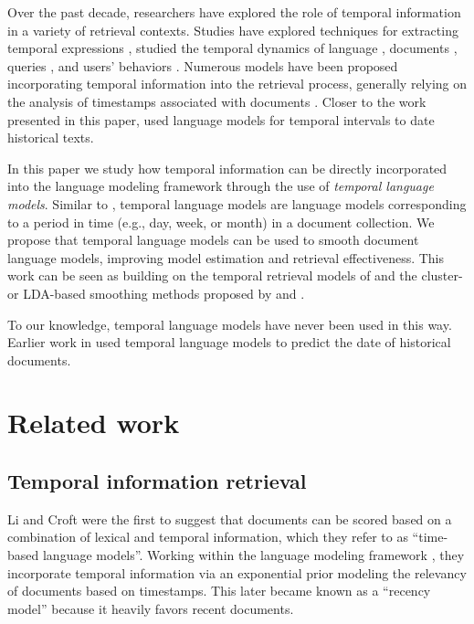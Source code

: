 \documentclass{sig-alternate}
\begin{document}
Over the past decade, researchers have explored the role of temporal information in a variety of 
retrieval contexts.  Studies have explored techniques for extracting temporal expressions \cite{Childs1999, Arikan2009, Alonso2012, Lin2014}, studied the temporal dynamics of language \cite{Michel2011a}, documents \cite{Teevan2009}, queries \cite{Jones2007, Shokouhi2011}, and users' behaviors \cite{Radinsky2012}.  Numerous models have been proposed incorporating temporal information into the retrieval process, generally relying on the analysis of timestamps associated with documents \cite{Li2003, Dakka2012, Efron2011, Efron2014, Peetz2013a}. Closer to the work presented in this paper, \cite{DeJong2005} used language models for temporal intervals to date historical texts.

In this paper we study how temporal information can be directly incorporated into the language modeling framework through the use of \emph{temporal language models}.  Similar to \cite{DeJong2005}, temporal language models are language models corresponding to a period in time (e.g., day, week, or month) in a document collection.  We propose that temporal language models can be used to smooth document language models, improving model estimation and retrieval effectiveness. This work can be seen as building on the temporal retrieval models of \cite{Li2003, Dakka2012, Efron2011, Efron2014} and the cluster- or LDA-based smoothing methods proposed by \cite{Liu2004} and \cite{Wei2006}.

To our knowledge, temporal language models have never been used in this way.  Earlier work in \cite{DeJong2005} used temporal language models to predict the date of historical documents.

\section{Related work}

\subsection{Temporal information retrieval}

Li and Croft \cite{Li2003} were the first to suggest that documents can be scored based on a combination of lexical and temporal information, which they refer to as ``time-based language models''. Working within the language modeling framework \cite{Ponte1998}, they incorporate temporal information via an exponential prior modeling the relevancy of documents based on timestamps. This later became known as a ``recency model'' because it heavily favors recent documents.
\end{document}
